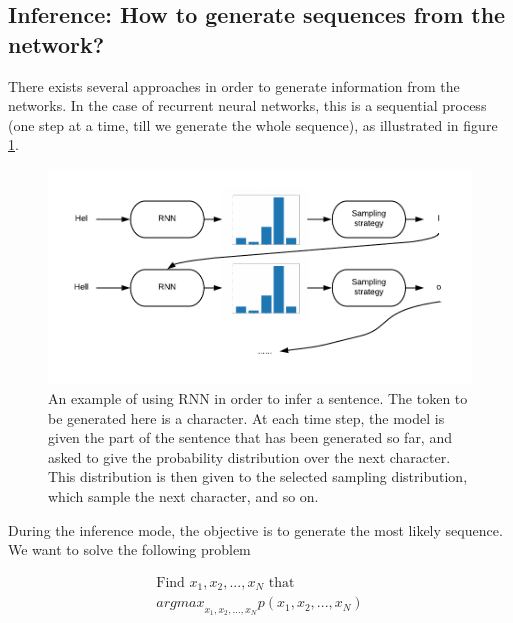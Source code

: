 \subsection{Inference: How to generate sequences from the network?}
\par There exists several approaches in order to generate information from the networks. In the case of recurrent neural networks, this is a sequential process (one step at a time, till we generate the whole sequence), as illustrated in figure \ref{fig:text_gen}.

\begin{figure}
    \centering
    \includegraphics{images/gbem/text_gen.png}
    \caption{An example of using RNN in order to infer a sentence. The token to be generated here is a character. At each time step, the model is given the part of the sentence that has been generated so far, and asked to give the probability distribution over the next character. This distribution is then given to the selected sampling distribution, which sample the next character, and so on.}
    \label{fig:text_gen}
\end{figure}

During the inference mode, the objective is to generate the most likely sequence. We want to solve the following problem

\begin{equation}
    \begin{split}
    \textrm{Find $x_1, x_2, ..., x_N$ that }\\
    {argmax}_{x_1, x_2, ..., x_N}p(x_1, x_2, ..., x_N)
    \label{eq:rnn_obj_inf}
    \end{split}
\end{equation}

